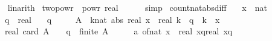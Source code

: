 \begin{isabellebody}
%
\isadelimproof
\ \ %
\endisadelimproof
%
\isatagproof
{}\isamarkupfalse%
\ linarith%
\endisatagproof
{\isafoldproof}%
%
\isadelimproof
\isanewline
%
\endisadelimproof
\isanewline
{}\isamarkupfalse%
\ two{\isacharunderscore}{\kern0pt}powr{\isacharunderscore}{\kern0pt}{}{\isacharcolon}{\kern0pt}\ {\isachardoublequoteopen}{}\ powr\ {\isacharparenleft}{\kern0pt}{}{\isacharcolon}{\kern0pt}{\isacharcolon}{\kern0pt}real{\isacharparenright}{\kern0pt}\ {\isacharequal}{\kern0pt}\ {}{\isachardoublequoteclose}\isanewline
%
\isadelimproof
\ \ %
\endisadelimproof
%
\isatagproof
{}\isamarkupfalse%
\ simp%
\endisatagproof
{\isafoldproof}%
%
\isadelimproof
\isanewline
%
\endisadelimproof
\isanewline
{}\isamarkupfalse%
\ count{\isacharunderscore}{\kern0pt}nat{\isacharunderscore}{\kern0pt}abs{\isacharunderscore}{\kern0pt}diff{\isacharunderscore}{\kern0pt}{}{\isacharcolon}{\kern0pt}\isanewline
\ \ \ x\ {\isacharcolon}{\kern0pt}{\isacharcolon}{\kern0pt}\ nat\isanewline
\ \ \ q\ {\isacharcolon}{\kern0pt}{\isacharcolon}{\kern0pt}\ real\isanewline
\ \ \ {\isachardoublequoteopen}q\ {\isasymge}\ {}{\isachardoublequoteclose}\isanewline
\ \ \ {\isachardoublequoteopen}A\ {\isasymequiv}\ {\isacharbraceleft}{\kern0pt}{\isacharparenleft}{\kern0pt}k{\isacharcolon}{\kern0pt}{\isacharcolon}{\kern0pt}nat{\isacharparenright}{\kern0pt}{\isachardot}{\kern0pt}\ abs\ {\isacharparenleft}{\kern0pt}real\ x\ {\isacharminus}{\kern0pt}\ real\ k{\isacharparenright}{\kern0pt}\ {\isasymle}\ q\ {\isasymand}\ k\ {\isasymnoteq}\ x{\isacharbraceright}{\kern0pt}{\isachardoublequoteclose}\isanewline
\ \ \ {\isachardoublequoteopen}real\ {\isacharparenleft}{\kern0pt}card\ A{\isacharparenright}{\kern0pt}\ {\isasymle}\ {}\ {\isacharasterisk}{\kern0pt}\ q{\isachardoublequoteclose}\ \ {\isachardoublequoteopen}finite\ A{\isachardoublequoteclose}\isanewline
%
\isadelimproof
%
\endisadelimproof
%
\isatagproof
{}\isamarkupfalse%
\ {\isacharminus}{\kern0pt}\isanewline
\ \ \isamarkupfalse%
\ a{\isacharcolon}{\kern0pt}\ {\isachardoublequoteopen}of{\isacharunderscore}{\kern0pt}nat\ x\ {\isasymin}\ {\isacharbraceleft}{\kern0pt}{\isasymlceil}real\ x{\isacharminus}{\kern0pt}q{\isasymrceil}{\isachardot}{\kern0pt}{\isachardot}{\kern0pt}{\isasymlfloor}real\ x{\isacharplus}{\kern0pt}q{\isasymrfloor}{\isacharbraceright}{\kern0pt}{\isachardoublequoteclose}\isanewline

\end{isabellebody}
